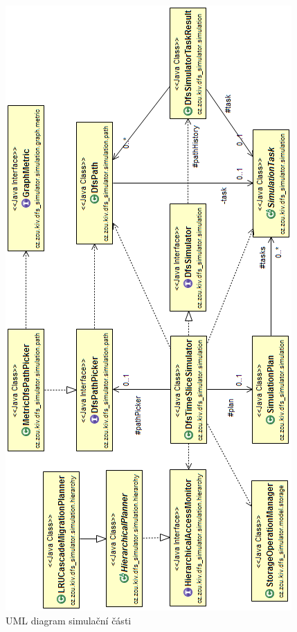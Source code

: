 \documentclass[czech,DP]{thesiskiv}
\begin{document}
\begin{figure}[H]
\centering
	\includegraphics{img/uml_simulace.png}
\caption{UML diagram simulační části}
\label{fig:uml_simulace}
\end{figure}
\end{document}
